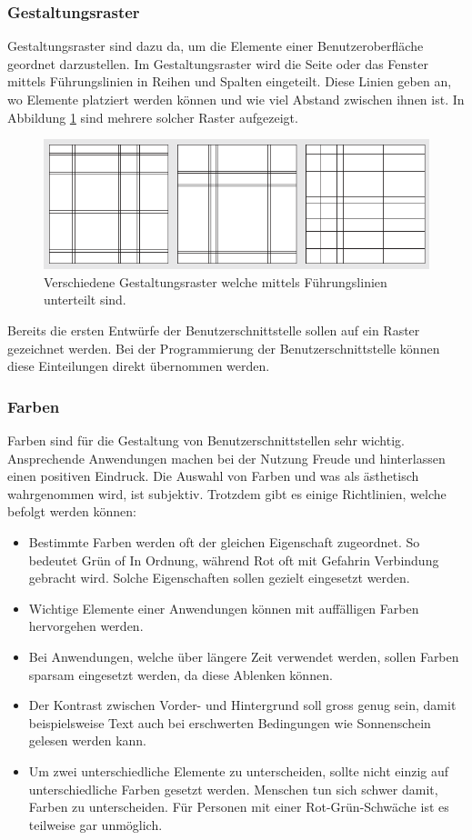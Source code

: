 \subsubsection{Gestaltungsraster}
Gestaltungsraster sind dazu da, um die Elemente einer Benutzeroberfläche geordnet darzustellen.
Im Gestaltungsraster wird die Seite oder das Fenster mittels Führungslinien in Reihen und Spalten eingeteilt.
Diese Linien geben an, wo Elemente platziert werden können und wie viel Abstand zwischen ihnen ist.
In Abbildung \ref{fig:Gestaltungsraster} sind mehrere solcher Raster aufgezeigt.
\begin{figure}[H]
   \centering
   \includegraphics[width=1.0\textwidth]{gfx/Gestaltungsraster_aus_buch.png}
   \caption{
      Verschiedene Gestaltungsraster welche mittels Führungslinien unterteilt sind.
   }
   \label{fig:Gestaltungsraster}
\end{figure}
Bereits die ersten Entwürfe der Benutzerschnittstelle sollen auf ein Raster gezeichnet werden.
Bei der Programmierung der Benutzerschnittstelle können diese Einteilungen direkt übernommen werden.


\subsubsection{Farben}
Farben sind für die Gestaltung von Benutzerschnittstellen sehr wichtig.
Ansprechende Anwendungen machen bei der Nutzung Freude und hinterlassen einen positiven Eindruck.
Die Auswahl von Farben und was als ästhetisch wahrgenommen wird, ist subjektiv.
Trotzdem gibt es einige Richtlinien, welche befolgt werden können:
\begin{itemize}
   \item Bestimmte Farben werden oft der gleichen Eigenschaft zugeordnet. So bedeutet Grün of \dq In Ordnung\dq, während Rot oft mit \dq Gefahr\dq in Verbindung gebracht wird. Solche Eigenschaften sollen gezielt eingesetzt werden.
   \item Wichtige Elemente einer Anwendungen können mit auffälligen Farben hervorgehen werden.
   \item Bei Anwendungen, welche über längere Zeit verwendet werden, sollen Farben sparsam eingesetzt werden, da diese Ablenken können.
   \item Der Kontrast zwischen Vorder- und Hintergrund soll gross genug sein, damit beispielsweise Text auch bei erschwerten Bedingungen wie Sonnenschein gelesen werden kann.
   \item Um zwei unterschiedliche Elemente zu unterscheiden, sollte nicht einzig auf unterschiedliche Farben gesetzt werden. Menschen tun sich schwer damit, Farben zu unterscheiden.
Für Personen mit einer Rot-Grün-Schwäche ist es teilweise gar unmöglich.
\end{itemize}


